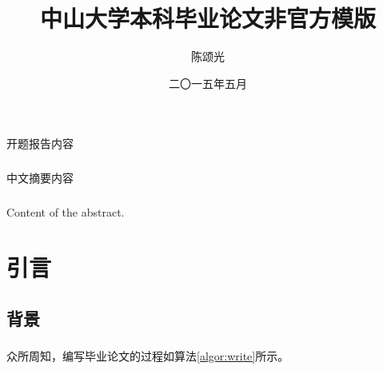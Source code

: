 ﻿\documentclass{sysuthesis}
\title{中山大学本科毕业论文非官方模版}%
\author{陈颂光}%
\date{二〇一五年五月}%
\begin{document}
\frontmatter
\begin{openingreport}
\paragraph{}开题报告内容
\end{openingreport}

\progresscheck%
\record%
\disclaim%

\begin{cabstract}
\paragraph{}中文摘要内容
\end{cabstract}

\begin{eabstract}
\paragraph{}Content of the abstract.
\end{eabstract}


\cleardoublepage
\tableofcontents%
\cleardoublepage
\listoftables%
\cleardoublepage
\listoffigures%
\cleardoublepage
\listofalgorithms%

\mainmatter



\chapter{引言}

\section{背景}

\paragraph{} 众所周知，编写毕业论文的过程如算法\ref{algor:write}所示。
\end{document}
